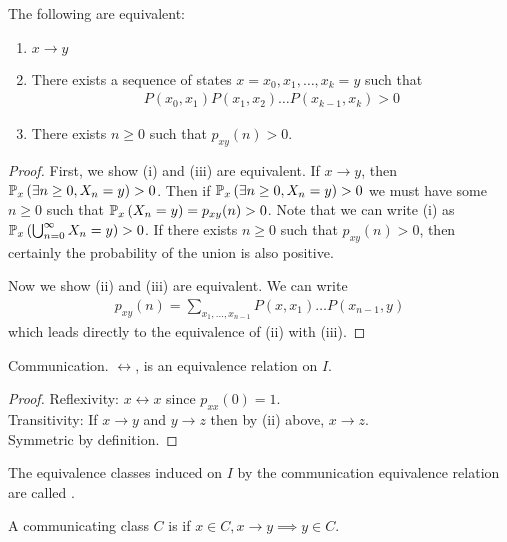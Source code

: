 \begin{theorem}
	The following are equivalent:
	\begin{enumerate}
		\item $x \to y$
		\item There exists a sequence of states $x = x_0, x_1, \dots, x_k = y$ such that
		      \begin{align*}
			      P(x_0, x_1)P(x_1,x_2)\dots P(x_{k-1},x_k) > 0
		      \end{align*}
		\item There exists $n \geq 0$ such that $p_{xy}(n) > 0$.
	\end{enumerate}
\end{theorem}
\begin{proof}
	First, we show (i) and (iii) are equivalent.
	If $x \to y$, then $\mathbb{P}_{x}\left({\exists n \geq 0, X_n = y}\right) > 0$.
	Then if $\mathbb{P}_{x}\left({\exists n \geq 0, X_n = y}\right) > 0$ we must have some $n \geq 0$ such that $\mathbb{P}_{x}\left({X_n = y}\right) = p_{xy}(n) > 0$.
	Note that we can write (i) as $\mathbb{P}_{x}\left({\bigcup_{n=0}^\infty X_n = y}\right) > 0$.
	If there exists $n \geq 0$ such that $p_{xy}(n) > 0$, then certainly the probability of the union is also positive.

	Now we show (ii) and (iii) are equivalent.
	We can write
	\begin{align*}
		p_{xy}(n) = \sum_{x_1, \dots, x_{n-1}} P(x, x_1) \dots P(x_{n-1}, y)
	\end{align*}
	which leads directly to the equivalence of (ii) with (iii).
\end{proof}
\begin{corollary}
	Communication. $\leftrightarrow$, is an equivalence relation on $I$.
\end{corollary}
\begin{proof}
	Reflexivity: $x \leftrightarrow x$ since $p_{xx}(0) = 1$. \\
	Transitivity: If $x \to y$ and $y \to z$ then by (ii) above, $x \to z$. \\
	Symmetric by definition.
\end{proof}
\begin{definition}
	The equivalence classes induced on $I$ by the communication equivalence relation are called .
\end{definition}

\begin{definition}
	A communicating class $C$ is  if $x \in C, x \to y \implies y \in C$.
\end{definition} 

